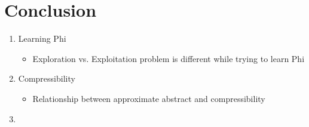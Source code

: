 \documentclass{article}
\begin{document}
\section{Conclusion}


\begin{enumerate}
\item Learning Phi
\begin{itemize}
\item Exploration vs. Exploitation problem is different while trying to learn Phi
\end{itemize}
\item Compressibility
\begin{itemize}
\item Relationship between approximate abstract and compressibility
\end{itemize}
\item 
\end{enumerate}







\end{document}
